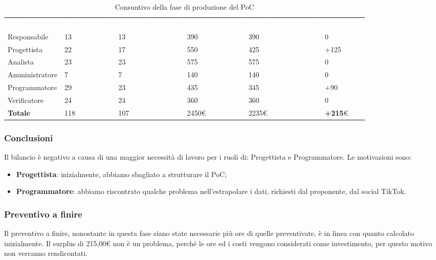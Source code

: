 \begin{table}[H]
\begin{center}
\renewcommand{\arraystretch}{1.5}
\begin{tabular}{ m{}<{\centering}  m{}<{\centering} m{}<{\centering} m{}<{\centering} m{}<{\centering} m{}<{\centering}}
	\rowcolor{darkblue}
	\textcolor{white}{\textbf{Ruolo}} & \textcolor{white}{\textbf{Ore Effettive}} & \textcolor{white}{\textbf{Ore Preventivate}}&\textcolor{white}{\textbf{Costo Effettivo}}&\textcolor{white}{\textbf{Costo Preventivato}}&\textcolor{white}{\textbf{Differenza}}\\ 
	Responsabile  & 13 & 13 & 390 & 390 & 0\\	
	
	Progettista & 22 & 17 & 550 & 425 & +125\\
	
	Analista & 23 & 23 & 575 & 575 & 0\\
	
	Amministratore & 7 & 7 & 140 & 140 & 0\\
	
	Programmatore & 29 & 23 & 435 & 345 &  +90\\
	
	Verificatore & 24 & 24 & 360 & 360 & 0\\
	
	\textbf{Totale} & 118 & 107 & 2450\euro & 2235\euro & \textbf{+215}\euro \\
	
\end{tabular}
\caption{Consuntivo della fase di produzione del PoC}
\end{center}
\end{table}

\subsubsection{Conclusioni}
Il bilancio è negativo a causa di una maggior necessità di lavoro per i ruoli di: Progettista e Programmatore. Le motivazioni sono:
\begin{itemize}
\item \textbf{Progettista}: inizialmente, abbiamo sbagliato a strutturare il PoC;
\item \textbf{Programmatore}: abbiamo riscontrato qualche problema nell'estrapolare i dati, richiesti dal proponente, dal social TikTok.
\end{itemize}

\subsubsection{Preventivo a finire}
Il preventivo a finire, nonostante in questa fase siano state necessarie più ore di quelle preventivate, è in linea con quanto calcolato inizialmente. Il surplus di 215,00\euro \xspace non è un problema, perché le ore ed i costi vengono considerati come investimento, per questo motivo non verranno rendicontati.